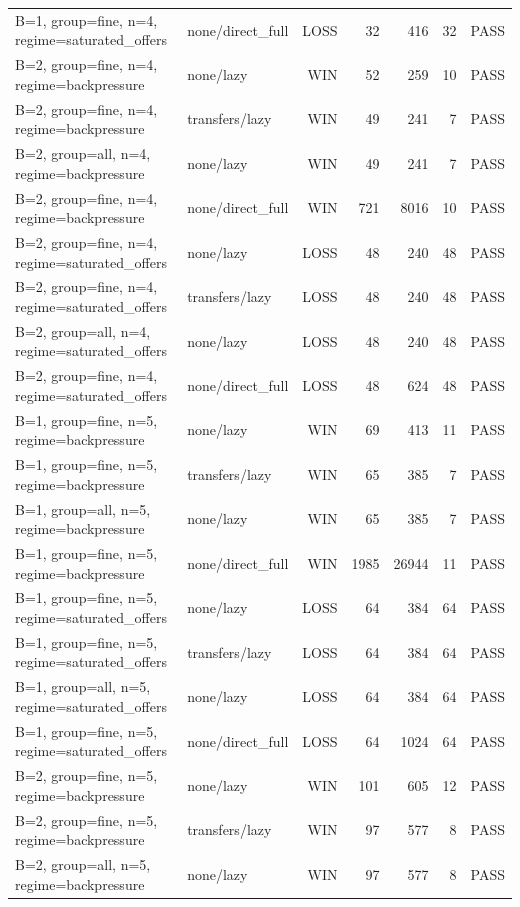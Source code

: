 \begin{longtable}{llrrrrl}
B=1, group=fine, n=4, regime=saturated\_offers & none/direct\_full & LOSS & 32 & 416 & 32 & PASS \\
B=2, group=fine, n=4, regime=backpressure & none/lazy & WIN & 52 & 259 & 10 & PASS \\
B=2, group=fine, n=4, regime=backpressure & transfers/lazy & WIN & 49 & 241 & 7 & PASS \\
B=2, group=all, n=4, regime=backpressure & none/lazy & WIN & 49 & 241 & 7 & PASS \\
B=2, group=fine, n=4, regime=backpressure & none/direct\_full & WIN & 721 & 8016 & 10 & PASS \\
B=2, group=fine, n=4, regime=saturated\_offers & none/lazy & LOSS & 48 & 240 & 48 & PASS \\
B=2, group=fine, n=4, regime=saturated\_offers & transfers/lazy & LOSS & 48 & 240 & 48 & PASS \\
B=2, group=all, n=4, regime=saturated\_offers & none/lazy & LOSS & 48 & 240 & 48 & PASS \\
B=2, group=fine, n=4, regime=saturated\_offers & none/direct\_full & LOSS & 48 & 624 & 48 & PASS \\
B=1, group=fine, n=5, regime=backpressure & none/lazy & WIN & 69 & 413 & 11 & PASS \\
B=1, group=fine, n=5, regime=backpressure & transfers/lazy & WIN & 65 & 385 & 7 & PASS \\
B=1, group=all, n=5, regime=backpressure & none/lazy & WIN & 65 & 385 & 7 & PASS \\
B=1, group=fine, n=5, regime=backpressure & none/direct\_full & WIN & 1985 & 26944 & 11 & PASS \\
B=1, group=fine, n=5, regime=saturated\_offers & none/lazy & LOSS & 64 & 384 & 64 & PASS \\
B=1, group=fine, n=5, regime=saturated\_offers & transfers/lazy & LOSS & 64 & 384 & 64 & PASS \\
B=1, group=all, n=5, regime=saturated\_offers & none/lazy & LOSS & 64 & 384 & 64 & PASS \\
B=1, group=fine, n=5, regime=saturated\_offers & none/direct\_full & LOSS & 64 & 1024 & 64 & PASS \\
B=2, group=fine, n=5, regime=backpressure & none/lazy & WIN & 101 & 605 & 12 & PASS \\
B=2, group=fine, n=5, regime=backpressure & transfers/lazy & WIN & 97 & 577 & 8 & PASS \\
B=2, group=all, n=5, regime=backpressure & none/lazy & WIN & 97 & 577 & 8 & PASS \\

\end{longtable}
